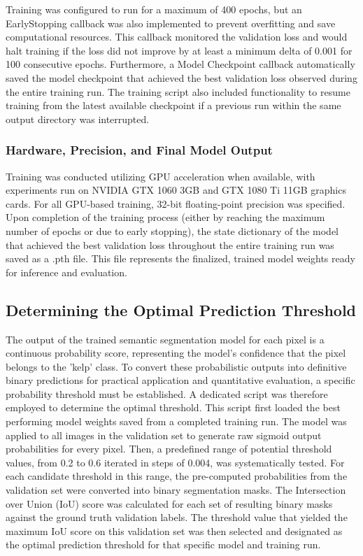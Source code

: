 \documentclass{article}
\begin{document}
Training was configured to run for a maximum of 400 epochs, but an EarlyStopping callback was also implemented to prevent overfitting and save computational resources. This callback monitored the validation loss and would halt training if the loss did not improve by at least a minimum delta of 0.001 for 100 consecutive epochs. Furthermore, a Model Checkpoint callback automatically saved the model checkpoint that achieved the best validation loss observed during the entire training run. The training script also included functionality to resume training from the latest available checkpoint if a previous run within the same output directory was interrupted.

\subsubsection{Hardware, Precision, and Final Model Output}

Training was conducted utilizing GPU acceleration when available, with experiments run on NVIDIA GTX 1060 3GB and GTX 1080 Ti 11GB graphics cards. For all GPU-based training, 32-bit floating-point precision was specified. Upon completion of the training process (either by reaching the maximum number of epochs or due to early stopping), the state dictionary of the model that achieved the best validation loss throughout the entire training run was saved as a .pth file. This file represents the finalized, trained model weights ready for inference and evaluation.

\subsection{Determining the Optimal Prediction Threshold}

The output of the trained semantic segmentation model for each pixel is a continuous probability score, representing the model's confidence that the pixel belongs to the 'kelp' class. To convert these probabilistic outputs into definitive binary predictions for practical application and quantitative evaluation, a specific probability threshold must be established. A dedicated script was therefore employed to determine the optimal threshold. This script first loaded the best performing model weights saved from a completed training run. The model was applied to all images in the validation set to generate raw sigmoid output probabilities for every pixel. Then, a predefined range of potential threshold values, from 0.2 to 0.6 iterated in steps of 0.004, was systematically tested. For each candidate threshold in this range, the pre-computed probabilities from the validation set were converted into binary segmentation masks. The Intersection over Union (IoU) score was calculated for each set of resulting binary masks against the ground truth validation labels. The threshold value that yielded the maximum IoU score on this validation set was then selected and designated as the optimal prediction threshold for that specific model and training run.
\end{document}
